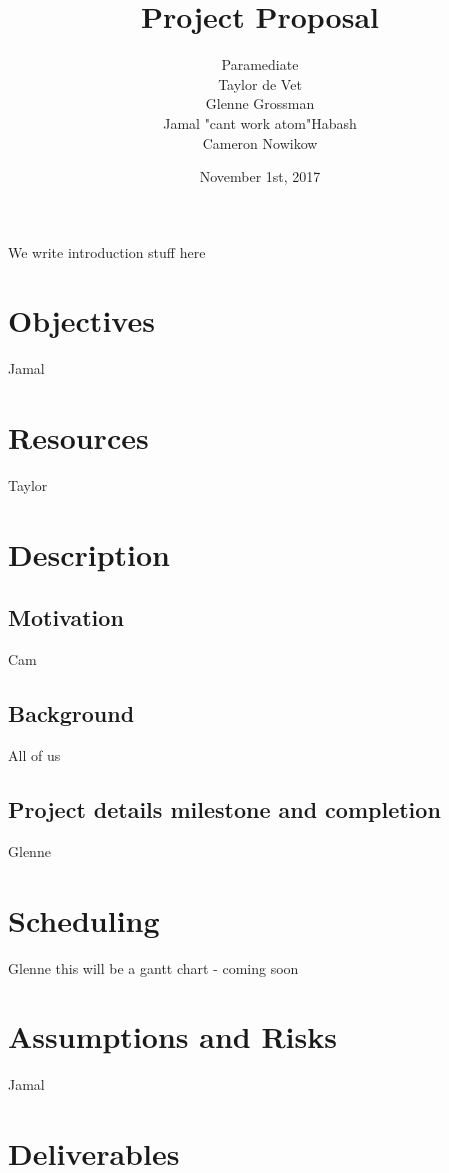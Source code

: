 \documentclass{article}
\title{Project Proposal}
\author{Paramediate
		\\ Taylor de Vet
    \\ Glenne Grossman
		\\ Jamal "cant work atom"Habash
		\\ Cameron Nowikow
}
\date{November 1st, 2017}
\begin{document}
\newpage

\maketitle

We write introduction stuff here

\section{Objectives}
Jamal

\section{Resources}
Taylor


\section{Description}

\subsection{Motivation}
Cam
\subsection{Background}
All of us
\subsection{Project details milestone and completion}
Glenne
\section{Scheduling}
Glenne this will be a gantt chart - coming soon
\section{Assumptions and Risks}
Jamal
\section{Deliverables}
\end{document}
